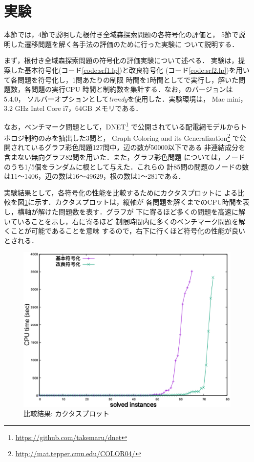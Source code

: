 \section{実験}\label{chap:exp}

本節では，4節で説明した根付き全域森探索問題の各符号化の評価と，
5節で説明した遷移問題を解く各手法の評価のために行った実験に
ついて説明する．

まず，根付き全域森探索問題の符号化の評価実験について述べる．
実験は，提案した基本符号化(コード\ref{code:srf1.lp})と改良符号化
(コード\ref{code:srf2.lp})を用いて各問題を符号化し，1問あたりの制限
時間を1時間として\clingo で実行し，解いた問題数，各問題の実行CPU
時間と制約数を集計する．なお，\clingo のバージョンは 5.4.0，
ソルバーオプションとして\textit{trendy}を使用した．実験環境は，
Mac mini，3.2 GHz Intel Core i7，64GB メモリである．

なお，ベンチマーク問題として，DNET\footnote{\url{https://github.com/takemaru/dnet}}
で公開されている配電網モデルからトポロジ制約のみを抽出した3問と，
Graph Coloring and its Generalization\footnote{\url{http://mat.tepper.cmu.edu/COLOR04/}}
で公開されているグラフ彩色問題127問中，辺の数が50000以下である
非連結成分を含まない無向グラフ82問を用いた．また，グラフ彩色問題
については，ノードのうち1/5個をランダムに根として与えた．これらの
計85問の問題のノードの数は11〜1406，辺の数は16〜49629，根の数は1〜281である．

実験結果として，各符号化の性能を比較するためにカクタスプロットに
よる比較を図\ref{fig:cactus}に示す．カクタスプロットは，縦軸が
各問題を解くまでのCPU時間を表し，横軸が解けた問題数を表す．グラフが
下に寄るほど多くの問題を高速に解いていることを示し，右に寄るほど
制限時間内に多くのベンチマーク問題を解くことが可能であることを意味
するので，右下に行くほど符号化の性能が良いとされる．

\begin{figure}[htbp]
 \centering
 \includegraphics[scale=0.3]{fig/cactus.eps}
 \caption{比較結果: カクタスプロット} 
 \label{fig:cactus}
\end{figure}

